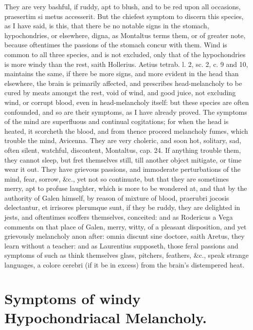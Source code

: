 {They are very bashful, if ruddy, apt to blush, and to be red upon all
occasions, praesertim si metus accesserit. But the chiefest symptom to
discern this species, as I have said, is this, that there be no notable
signs in the stomach, hypochondries, or elsewhere, digna, as 
Montaltus terms them, or of greater note, because oftentimes the
passions of the stomach concur with them. Wind is common to all three
species, and is not excluded, only that of the hypochondries is
more windy than the rest, saith Hollerius. Aetius tetrab. l. 2,
sc. 2, c. 9 and 10, maintains the same, if there be more signs,
and more evident in the head than elsewhere, the brain is primarily
affected, and prescribes head-melancholy to be cured by meats amongst
the rest, void of wind, and good juice, not excluding wind, or corrupt
blood, even in head-melancholy itself: but these species are often
confounded, and so are their symptoms, as I have already proved. The
symptoms of the mind are superfluous and continual cogitations;
for when the head is heated, it scorcheth the blood, and from
thence proceed melancholy fumes, which trouble the mind, Avicenna. They
are very choleric, and soon hot, solitary, sad, often silent, watchful,
discontent, Montaltus, cap. 24. If anything trouble them, they cannot
sleep, but fret themselves still, till another object mitigate, or time
wear it out. They have grievous passions, and immoderate perturbations
of the mind, fear, sorrow, \&c., yet not so continuate, but that they
are sometimes merry, apt to profuse laughter, which is more to be
wondered at, and that by the authority of Galen himself, by
reason of mixture of blood, praerubri jocosis delectantur, et irrisores
plerumque sunt, if they be ruddy, they are delighted in jests, and
oftentimes scoffers themselves, conceited: and as Rodericus a Vega
comments on that place of Galen, merry, witty, of a pleasant
disposition, and yet grievously melancholy anon after: omnia discunt
sine doctore, saith Aretus, they learn without a teacher: and as
Laurentius supposeth, those feral passions and symptoms of such
as think themselves glass, pitchers, feathers, \&c., speak strange
languages, a colore cerebri (if it be in excess) from the brain's
distempered heat.

\section{Symptoms of windy Hypochondriacal Melancholy.}

}
